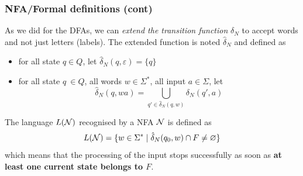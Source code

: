 %
\begin{frame}
\frametitle{NFA/Formal definitions (cont)}

As we did for the DFAs, we can \emph{extend the transition function}
\(\delta_N\) to accept words and not just letters (labels). The extended
function is noted \(\hat{\delta}_N\) and defined as
\begin{itemize}

  \item for all state \(q \in Q\), let \(\hat{\delta}_N (q,
  \varepsilon) = \{q\}\)

  \item for all state \(q\ \in Q\), all words \(w \in \Sigma^{*}\),
  all input \(a \in \Sigma\), let \[\hat{\delta}_N (q, wa) =
  \bigcup_{q' \in \hat{\delta}_N (q, w)}{\delta_N  (q', a)}\]
\end{itemize}
The language \(L({\cal N})\) recognised by a NFA \(\cal N\) is
defined as
\[
L({\cal N}) = \{w \in \Sigma^{*} \; \lvert \; \hat{\delta}_N (q_0, w)
\cap F \neq \varnothing\}
\]
which means that the processing of the input stops successfully as
soon as \textbf{at least one current state belongs to \(F\)}.

\end{frame}

